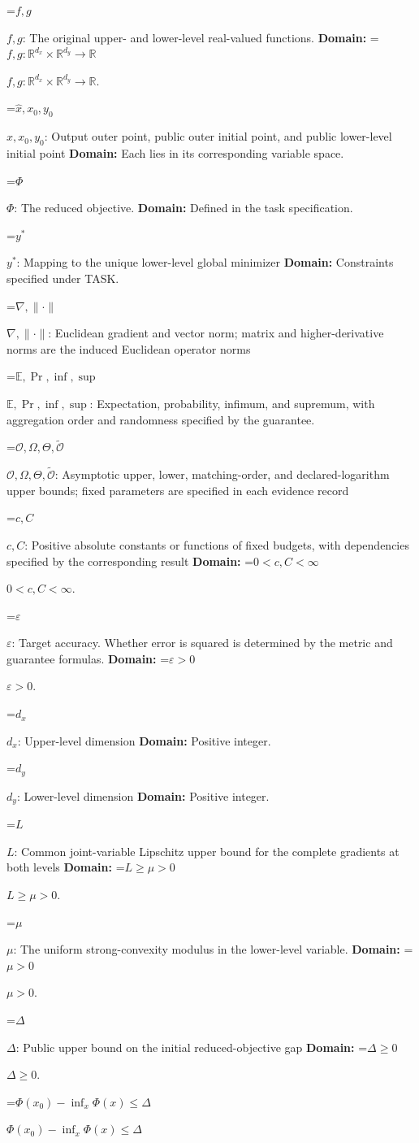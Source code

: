 \documentclass[10pt,a4paper]{article}
\newcommand{\AtlasMath}[1]{\par\begingroup\centering\setbox0=\hbox{$\displaystyle #1$}\ifdim\wd0>1.4\linewidth\typeout{ATLAS WIDE FORMULA: \the\wd0}\fi\ifdim\wd0>\linewidth\resizebox{\linewidth}{!}{\box0}\else\box0\fi\par\endgroup}
\newcommand{\AtlasInlineMath}[1]{\begingroup\setbox0=\hbox{$#1$}\ifdim\wd0>.4\linewidth\endgroup\AtlasMath{#1}\else\endgroup$#1$\fi}
\begin{document}
\AtlasInlineMath{f,g}: The original upper- and lower-level real-valued functions. \textbf{Domain:} \AtlasInlineMath{f,g:\mathbb R^{d_x}\times\mathbb R^{d_y}\to\mathbb R}.

\AtlasInlineMath{\widehat x,x_0,y_0}: Output outer point, public outer initial point, and public lower-level initial point \textbf{Domain:} Each lies in its corresponding variable space.

\AtlasInlineMath{\Phi}: The reduced objective. \textbf{Domain:} Defined in the task specification.

\AtlasInlineMath{y^*}: Mapping to the unique lower-level global minimizer \textbf{Domain:} Constraints specified under TASK.

\AtlasInlineMath{\nabla,\|\cdot\|}: Euclidean gradient and vector norm; matrix and higher-derivative norms are the induced Euclidean operator norms

\AtlasInlineMath{\mathbb E,\Pr,\inf,\sup}: Expectation, probability, infimum, and supremum, with aggregation order and randomness specified by the guarantee.

\AtlasInlineMath{\mathcal O,\Omega,\Theta,\widetilde{\mathcal O}}: Asymptotic upper, lower, matching-order, and declared-logarithm upper bounds; fixed parameters are specified in each evidence record

\AtlasInlineMath{c,C}: Positive absolute constants or functions of fixed budgets, with dependencies specified by the corresponding result \textbf{Domain:} \AtlasInlineMath{0<c,C<\infty}.

\AtlasInlineMath{\varepsilon}: Target accuracy. Whether error is squared is determined by the metric and guarantee formulas. \textbf{Domain:} \AtlasInlineMath{\varepsilon>0}.

\AtlasInlineMath{d_x}: Upper-level dimension \textbf{Domain:} Positive integer.

\AtlasInlineMath{d_y}: Lower-level dimension \textbf{Domain:} Positive integer.

\AtlasInlineMath{L}: Common joint-variable Lipschitz upper bound for the complete gradients at both levels \textbf{Domain:} \AtlasInlineMath{L\ge\mu>0}.

\AtlasInlineMath{\mu}: The uniform strong-convexity modulus in the lower-level variable. \textbf{Domain:} \AtlasInlineMath{\mu>0}.

\AtlasInlineMath{\Delta}: Public upper bound on the initial reduced-objective gap \textbf{Domain:} \AtlasInlineMath{\Delta\ge0}.

\AtlasInlineMath{\Phi(x_0)-\inf_x\Phi(x)\le\Delta}
\end{document}
